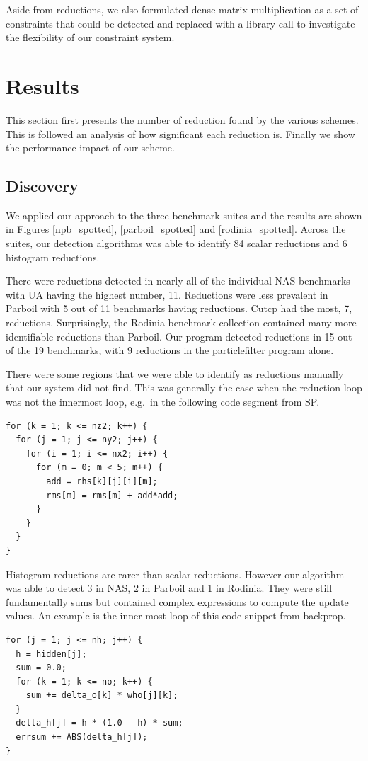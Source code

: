 Aside from reductions, we also formulated dense matrix multiplication
as a set of constraints that could be detected and replaced with a library call
to investigate the flexibility of our constraint system.

\section{Results}

This section first presents the number of reduction found by the
various schemes. This is followed an analysis of how significant each
reduction is. Finally we show the performance impact of our scheme.
   
\subsection{Discovery}
We applied our approach to the three benchmark suites  and the results are shown in Figures \ref{npb_spotted}, \ref{parboil_spotted} and \ref{rodinia_spotted}. 
Across the suites, our detection algorithms
was able to identify 84 scalar reductions and 6 histogram reductions.

There were reductions detected in nearly all of the individual NAS benchmarks with UA having the highest number, 11.
Reductions were less prevalent in Parboil with 5 out of 11
benchmarks having reductions. Cutcp had the most, 7, reductions. 
Surprisingly, the Rodinia benchmark collection contained many more identifiable reductions than Parboil.
Our program detected reductions in 15 out of the 19 benchmarks, with 9 reductions in the particlefilter program alone.

There were some regions that we were able to identify as reductions manually that our system did not find.
This was generally the case when the reduction loop was not the innermost loop, e.g.\ in the following code segment from SP.
\begin{lstlisting}
for (k = 1; k <= nz2; k++) {
  for (j = 1; j <= ny2; j++) {
    for (i = 1; i <= nx2; i++) {
      for (m = 0; m < 5; m++) {
        add = rhs[k][j][i][m];
        rms[m] = rms[m] + add*add;
      } 
    } 
  } 
}
\end{lstlisting}


Histogram reductions are rarer than scalar reductions.  However
our algorithm was able to detect 3 in NAS, 2 in Parboil and 1 in
Rodinia.   They were still fundamentally sums but contained
complex expressions to compute the update values.  An  example is the
inner most loop of this code snippet from backprop.
\begin{lstlisting}
for (j = 1; j <= nh; j++) {
  h = hidden[j];
  sum = 0.0;
  for (k = 1; k <= no; k++) {
    sum += delta_o[k] * who[j][k];
  }
  delta_h[j] = h * (1.0 - h) * sum;
  errsum += ABS(delta_h[j]);
}
\end{lstlisting}

